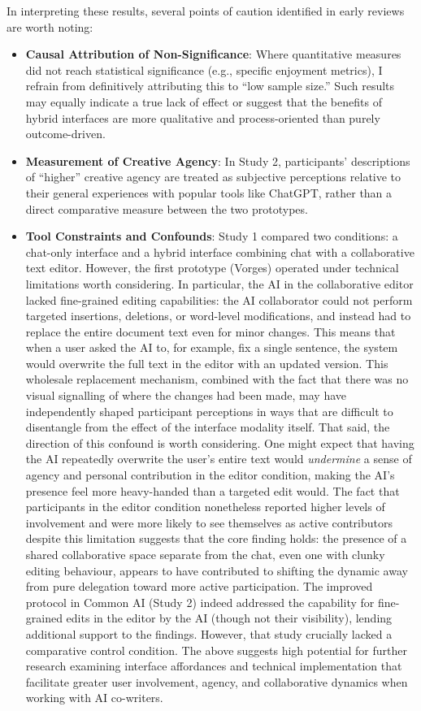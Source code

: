 In interpreting these results, several points of caution identified in early reviews are worth noting:
\begin{itemize}
\item \textbf{Causal Attribution of Non-Significance}: Where quantitative measures did not reach statistical significance (e.g., specific enjoyment metrics), I refrain from definitively attributing this to ``low sample size.'' Such results may equally indicate a true lack of effect or suggest that the benefits of hybrid interfaces are more qualitative and process-oriented than purely outcome-driven.
\item \textbf{Measurement of Creative Agency}: In Study 2, participants' descriptions of ``higher'' creative agency are treated as subjective perceptions relative to their general experiences with popular tools like ChatGPT, rather than a direct comparative measure between the two prototypes.
\item \textbf{Tool Constraints and Confounds}: Study 1 compared two conditions: a chat-only interface and a hybrid interface combining chat with a collaborative text editor. However, the first prototype (Vorges) operated under technical limitations worth considering. In particular, the AI in the collaborative editor lacked fine-grained editing capabilities: the AI collaborator could not perform targeted insertions, deletions, or word-level modifications, and instead had to replace the entire document text even for minor changes. This means that when a user asked the AI to, for example, fix a single sentence, the system would overwrite the full text in the editor with an updated version. This wholesale replacement mechanism, combined with the fact that there was no visual signalling of where the changes had been made, may have independently shaped participant perceptions in ways that are difficult to disentangle from the effect of the interface modality itself. That said, the direction of this confound is worth considering. One might expect that having the AI repeatedly overwrite the user's entire text would \emph{undermine} a sense of agency and personal contribution in the editor condition, making the AI's presence feel more heavy-handed than a targeted edit would. The fact that participants in the editor condition nonetheless reported higher levels of involvement and were more likely to see themselves as active contributors despite this limitation suggests that the core finding holds: the presence of a shared collaborative space separate from the chat, even one with clunky editing behaviour, appears to have contributed to shifting the dynamic away from pure delegation toward more active participation. The improved protocol in Common AI (Study 2) indeed addressed the capability for fine-grained edits in the editor by the AI (though not their visibility), lending additional support to the findings. However, that study crucially lacked a comparative control condition. The above suggests high potential for further research examining interface affordances and technical implementation that facilitate greater user involvement, agency, and collaborative dynamics when working with AI co-writers.

\end{itemize}

